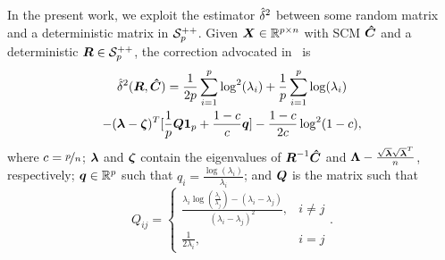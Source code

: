 \documentclass{article}
\theoremstyle{plain}
\theoremstyle{definition}
\theoremstyle{remark}
\begin{document}
%
In the present work, we exploit the estimator $\hat{\delta}^2$ between some random matrix and a deterministic matrix in $\mathcal{S}^{++}_{p}$.
Given $\boldsymbol{X}\in\mathbb{R}^{p\times n}$ with SCM $\boldsymbol{\hat{C}}$ and a deterministic $\boldsymbol{R}\in\mathcal{S}^{++}_{p}$, the correction advocated in~\cite{couillet2019random} is
\begin{multline}
    \hat{\delta}^2(\boldsymbol{R},\boldsymbol{\hat{C}}) = \frac1{2p}\sum_{i=1}^{p} \log^2(\lambda_i)
    + \frac1{p}\sum_{i=1}^{p} \log(\lambda_i)
    \\
    - (\boldsymbol{\lambda}-\boldsymbol{\zeta})^T[ \frac1{p}\boldsymbol{Q}\boldsymbol{1}_{p} +\frac{1-c}{c}\boldsymbol{q} ]
    - \frac{1-c}{2c}\log^2(1-c),
\label{eq:RMT_Fisher_SCM_deterministic}
\end{multline}
where $c=\nicefrac{p}{n}$;
$\boldsymbol{\lambda}$ and $\boldsymbol{\zeta}$ contain the eigenvalues of $\boldsymbol{R}^{-1}\boldsymbol{\hat{C}}$ and $\boldsymbol{\Lambda}-\frac{\sqrt{\boldsymbol{\lambda}}\sqrt{\boldsymbol{\lambda}}^T}{n}$, respectively;
$\boldsymbol{q}\in\mathbb{R}^{p}$ such that $q_i=\frac{\log(\lambda_i)}{\lambda_i}$;
and $\boldsymbol{Q}$ is the matrix such that
\begin{equation*}
    Q_{ij} = \left\{ 
    \begin{matrix}
        \frac{\lambda_i\log\left(\frac{\lambda_i}{\lambda_j}\right) - (\lambda_i-\lambda_j)}{(\lambda_i-\lambda_j)^2}, & i\neq j
        \\
        \frac1{2\lambda_i}, & i=j
    \end{matrix}
    \right. .
\end{equation*}
\end{document}
